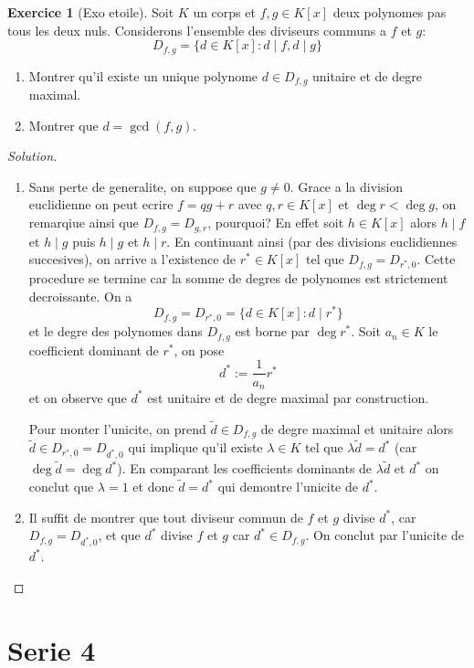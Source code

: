 \documentclass[a4paper,12pt,french]{report}
\theoremstyle{plain}
\theoremstyle{definition}
\newtheorem{exercise}{Exercice}[chapter]
\begin{document}
\begin{exercise}[Exo etoile]
Soit $K$ un corps et $f,g\in K[x]$ deux polynomes pas tous les deux nuls. Considerons l'ensemble des diviseurs communs a $f$ et $g$:
$$
D_{f,g}=\{ d\in K[x]:d\mid f , d\mid g\}
$$
\begin{enumerate}
\item Montrer qu'il existe un unique polynome $d\in D_{f,g}$ unitaire et de degre maximal.
\item Montrer que $d=\gcd(f,g)$.
\end{enumerate}
\end{exercise}
\begin{proof}[Solution]
\begin{enumerate}
\item Sans perte de generalite, on suppose que $g\neq 0$. Grace a la division euclidienne on peut ecrire $f=qg+r$ avec $q,r\in K[x]$ et $\deg r< \deg g$, on remarqiue ainsi que $D_{f,g}=D_{g,r}$, pourquoi? En effet soit $h\in K[x]$ alors $h \mid f$ et $h \mid g$ puis $h \mid g$ et $h \mid r$. En continuant ainsi (par des divisions euclidiennes succesives), on arrive a l'existence de $r^{*}\in K[x]$ tel que $D_{f,g}=D_{r^{*},0}$. Cette procedure se termine car la somme de degres de polynomes est strictement decroissante. On a
$$
D_{f,g}=D_{r^{*},0}=\{ d\in K[x]:d\mid r^{*} \}
$$
et le degre des polynomes dans $D_{f,g}$ est borne par $\deg r^{*}$. Soit $a_{n}\in K$ le coefficient dominant de $r^{*}$, on pose
$$
d^{*}:= \frac{1}{a_{n}}r^{*}
$$
et on observe que $d^{*}$ est unitaire et de degre maximal par construction.

Pour monter l'unicite, on prend $\tilde{d}\in D_{f,g}$ de degre maximal et unitaire alors $\tilde{d}\in D_{r^{*},0}=D_{d^{*},0}$ qui implique qu'il existe $\lambda \in K$ tel que $\lambda \tilde{d}=d^{*}$ (car $\deg \tilde{d} = \deg d^{*}$). En comparant les coefficients dominants de $\lambda \tilde{d}$ et $d^{*}$ on conclut que $\lambda=1$ et donc $\tilde{d}=d^{*}$ qui demontre l'unicite de $d^{*}$.
\item Il suffit de montrer que tout diviseur commun de $f$ et $g$ divise $d^{*}$, car $D_{f,g}=D_{d^{*},0}$, et que $d^{*}$ divise $f$ et $g$ car $d^{*}\in D_{f,g}$. On conclut par l'unicite de $d^{*}$.
\end{enumerate}
\end{proof}

\chapter{Serie 4}
\end{document}
